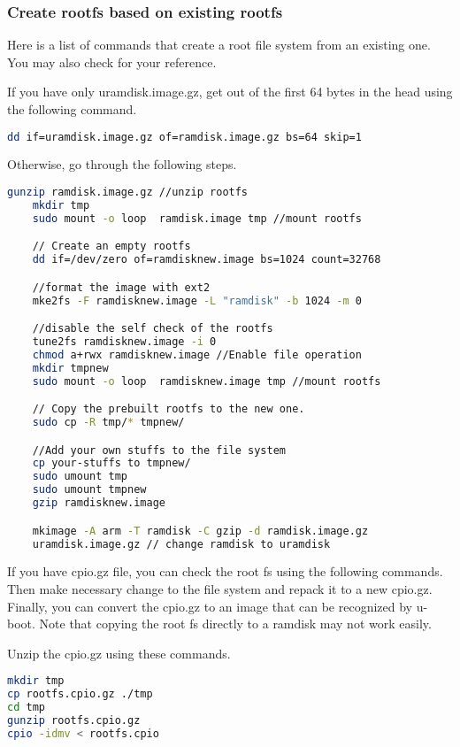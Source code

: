 \documentclass[12pt]{article} %
\begin{document}
\subsubsection{Create rootfs based on existing rootfs}
Here is a list of commands that create a root file system from an existing one. You may also check \cite{modify-rootfs} 
for your reference. 

If you have only uramdisk.image.gz, get out of the first 64 bytes in the head using the following command.
\begin{lstlisting}[language=bash]
    dd if=uramdisk.image.gz of=ramdisk.image.gz bs=64 skip=1
\end{lstlisting}

Otherwise, go through the following steps.
\begin{lstlisting}[language=bash]
    gunzip ramdisk.image.gz //unzip rootfs 
    mkdir tmp 
    sudo mount -o loop  ramdisk.image tmp //mount rootfs

    // Create an empty rootfs 
    dd if=/dev/zero of=ramdisknew.image bs=1024 count=32768

    //format the image with ext2 
    mke2fs -F ramdisknew.image -L "ramdisk" -b 1024 -m 0

    //disable the self check of the rootfs
    tune2fs ramdisknew.image -i 0
    chmod a+rwx ramdisknew.image //Enable file operation
    mkdir tmpnew
    sudo mount -o loop  ramdisknew.image tmp //mount rootfs

    // Copy the prebuilt rootfs to the new one.
    sudo cp -R tmp/* tmpnew/ 

    //Add your own stuffs to the file system
    cp your-stuffs to tmpnew/
    sudo umount tmp
    sudo umount tmpnew
    gzip ramdisknew.image

    mkimage -A arm -T ramdisk -C gzip -d ramdisk.image.gz
    uramdisk.image.gz // change ramdisk to uramdisk 
\end{lstlisting}

If you have cpio.gz file, you can check the root fs using the following commands.
Then make necessary change to the file system and repack it to a new cpio.gz. Finally, 
you can convert the cpio.gz to an image that can be recognized by u-boot. 
Note that copying the root fs directly to a ramdisk may not work easily.

Unzip the cpio.gz using these commands.
\begin{lstlisting}[language=bash]
mkdir tmp
cp rootfs.cpio.gz ./tmp
cd tmp
gunzip rootfs.cpio.gz
cpio -idmv < rootfs.cpio
\end{lstlisting}
\end{document}
